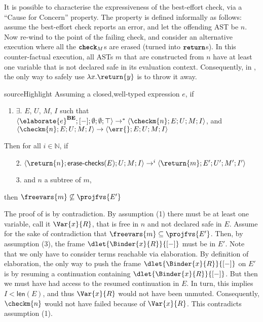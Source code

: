 It is possible to characterise the expressiveness of the best-effort check, via a ``Cause for Concern'' property. The property is defined informally as follows: assume the best-effort check reports an error, and let the offending AST be $n$. Now re-wind to the point of the failing check, and consider an alternative execution where all the $\textbf{\texttt{check}}_M$s are erased (turned into $\textbf{\texttt{return}}$s). In this counter-factual execution, all ASTs $m$ that are constructed from $n$ have at least one variable that is not declared safe in its evaluation context. Consequently, in , the only way to safely use $\lambda x.\return{y}$ is to throw it away. 

\begin{theorem}{sourceHighlight}\label{thm:best-effort-cause-for-concern} Assuming a closed,well-typed \sourceLang{} expression $e$, if
  \begin{enumerate}
    \item $\exists.$ $E$, $U$, $M$, $I$ such that $\langle \elaborate{e}^{\textbf{BE}}; [-];\emptyset; \emptyset; \top \rangle \to^{*}\langle \checkm{n}; E; U; M; I \rangle$,
    and \\$\langle \checkm{n}; E; U; M; I \rangle \to \langle \err{}; E; U; M; I \rangle$
  \end{enumerate}
Then for all $i \in \mathbb{N}$, if 
\begin{enumerate}
  \item[2.] $\langle \return{n}; \textsf{erase-checks}(E); U; M; I \rangle \to^{i} \langle \return{m}; E'; U'; M'; I' \rangle$
  \item[3.] and $n$ a subtree of $m$,  
\end{enumerate}
then $\freevars{m} \not\subseteq \projfvs{E'}$  
\end{theorem}

The proof of  is by contradiction. By assumption (1) there must be at least one variable, call it $\Var{x}{R}$, that is free in $n$ and not declared safe in $E$. Assume for the sake of contradiction that $\freevars{m} \subseteq \projfvs{E'}$. Then, by assumption (3), the frame $\dlet{\Binder{x}{R}}{[-]}$ must be in $E'$. Note that we only have to consider terms reachable via elaboration. By definition of elaboration, the only way to push the frame $\dlet{\Binder{x}{R}}{[-]}$ on $E'$ is by resuming a continuation containing $\dlet{\Binder{x}{R}}{[-]}$. But then we must have had access to the resumed continuation in $E$. In turn, this implies $I < \textsf{len}(E)$, and thus $\Var{x}{R}$ would not have been unmuted. Consequently, $\checkm{n}$ would not have failed because of $\Var{x}{R}$. This contradicts assumption (1). 

